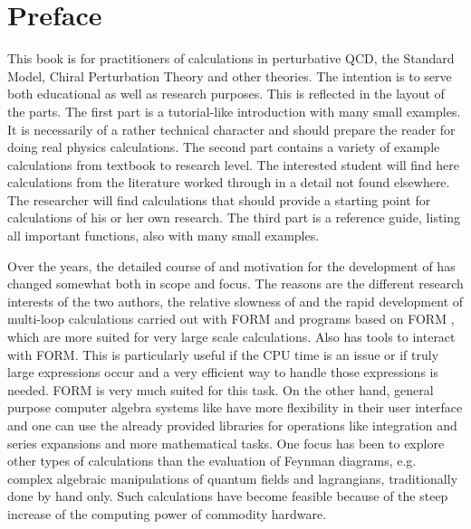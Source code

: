 \section*{Preface}

This book is for practitioners of calculations in perturbative QCD,
the Standard Model, Chiral Perturbation Theory and other theories.
The intention is to serve both educational as well as research purposes.
This is reflected in the layout of the parts.
The first part is a tutorial-like introduction with many small examples.
It is necessarily of a rather technical character and should prepare the
reader for doing real physics calculations.
The second part contains a variety of example calculations from textbook
to research level. The interested student will find here calculations 
from the literature worked through in a detail not found elsewhere.
The researcher will find calculations that should provide a starting point
for calculations of his or her own research.
The third part is a reference guide, listing all important functions,
also with many small examples.

Over the years, the detailed course of and motivation for the development of \fc has
changed somewhat both in scope and focus. The reasons are the different research
interests of the two authors, the relative slowness of \mma and the rapid development of
multi-loop calculations carried out with FORM and programs based on FORM 
\cite{Vermaseren:2000nd, Hahn:1998yk}, which are  more suited for very large scale calculations.
Also \fc has tools to interact with FORM. This is particularly useful if the CPU time is
an issue or if truly large expressions occur and a very efficient way to handle those 
expressions is needed. FORM is very much suited for this task. 
On the other hand, general purpose computer algebra systems like \mma have more flexibility in their user interface and one can use the already provided libraries for operations like
integration and series expansions and more mathematical tasks.
One focus has been to explore other types of calculations than the evaluation of Feynman
diagrams, e.g. complex algebraic manipulations of quantum fields and lagrangians, traditionally done by hand only.
Such calculations have become feasible because of the steep increase of the computing
power of commodity hardware.


